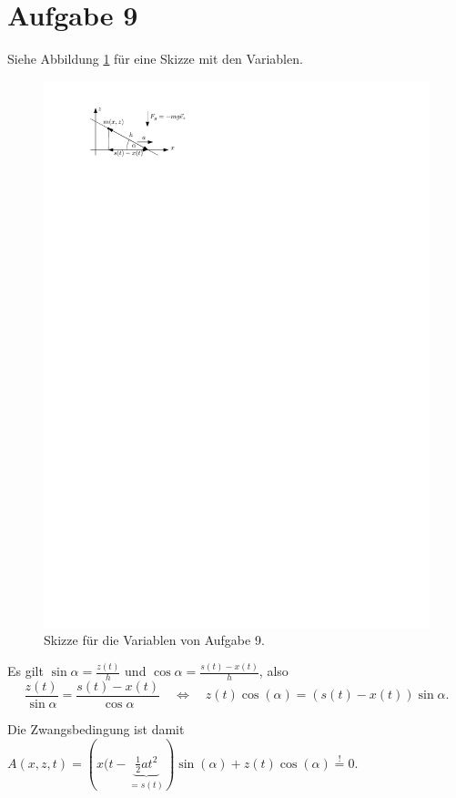 \section*{Aufgabe 9}
Siehe Abbildung \ref{fig:ueb4_aufgabe9} für eine Skizze mit den Variablen.

\begin{figure}[h]
	\centering
	\includegraphics[scale=1.5]{figures/ueb4/aufgabe9}
	\caption{Skizze für die Variablen von Aufgabe 9.}
	\label{fig:ueb4_aufgabe9}
\end{figure}

Es gilt $\sin \alpha = \frac{z(t)}{h}$ und $\cos \alpha = \frac{s(t) - x(t)}{h}$, also
\[
	\frac{z(t)}{\sin \alpha} = \frac{s(t) - x(t)}{\cos \alpha}
	\quad \Longleftrightarrow \quad 
	z(t) \cos(\alpha) = (s(t) - x(t)) \sin \alpha
	\text{.}
\]

Die Zwangsbedingung ist damit $A(x, z, t) = \left( x(t - \underbrace{\frac{1}{2} a t^2}_{= s(t)} \right) \sin(\alpha) + z(t) \cos(\alpha) \overset{!}{=} 0$.


